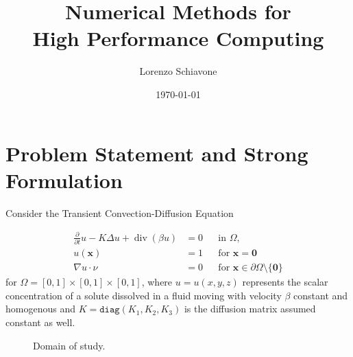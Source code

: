 \documentclass[hidelinks]{article}
\title{Numerical Methods for \\ High Performance Computing}
\author{Lorenzo Schiavone}
\date{\today}
\DeclareMathOperator{\divg}{div}
\begin{document}
\maketitle
\tableofcontents

\section{Problem Statement and Strong Formulation}
Consider the Transient Convection-Diffusion Equation 

\begin{equation}\tag{$D$}\label{eq:strong}
    \begin{aligned}
    \frac{\partial}{\partial t}u -K \Delta u + \divg(\beta u) &=0 && \text{in } \Omega, \\
    u(\mathbf{x}) &= 1 && \text{for } \mathbf{x} = \mathbf{0}  \\
    \nabla u \cdot \nu &= 0 && \text{for } \mathbf{x}\in \partial\Omega \setminus \{\mathbf{0}\} 
\end{aligned}
\end{equation}
for $\Omega = [0,1] \times [0,1]\times [0,1]$, where $u=u(x,y,z)$ represents the scalar concentration of a solute dissolved in a fluid moving with velocity $\beta$ constant and homogenous and $K=\texttt{diag}(K_1,K_2,K_3)$ is the diffusion matrix assumed constant as well.

\begin{figure}[H]
\begin{center}
\end{center}
\caption{Domain of study.}
\end{figure}
\end{document}
